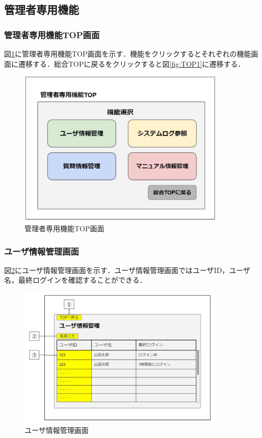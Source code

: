 \documentclass[main]{subfiles}
\begin{document}
\subsection{管理者専用機能}
\subsubsection{管理者専用機能TOP画面}
図\ref{fig:TOP2}に管理者専用機能TOP画面を示す．機能をクリックするとそれぞれの機能画面に遷移する．総合TOPに戻るをクリックすると図\ref{fig:TOP1}に遷移する．

\begin{figure}[H]
 \centering
   \includegraphics[width=100mm]{UI-umino/TOP2.JPG}
 \caption{管理者専用機能TOP画面}
 \label{fig:TOP2}
\end{figure}

\subsubsection{ユーザ情報管理画面}
図\ref{fig:user1}にユーザ情報管理画面を示す．ユーザ情報管理画面ではユーザID，ユーザ名，最終ログインを確認することができる．

\begin{figure}[H]
 \centering
   \includegraphics[width=100mm]{UI-umino/user1.JPG}
 \caption{ユーザ情報管理画面}
 \label{fig:user1}
\end{figure}
\end{document}
